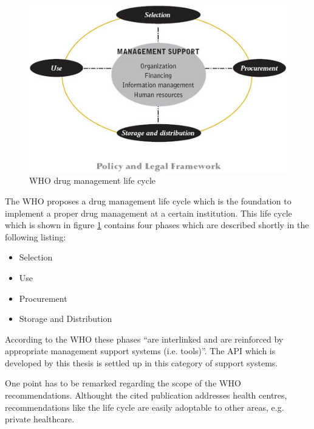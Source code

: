 \begin{figure}
  \centering
  \includegraphics[scale=2]{preliminaries/life_cycle.jpg}
  \caption{WHO drug management life cycle}
  \label{fig:life_cycle}
\end{figure}
The WHO proposes a drug management life cycle which is the foundation to implement a proper drug management at a certain institution.
This life cycle which is shown in figure \ref{fig:life_cycle} contains four phases which are described shortly in the following listing:
\begin{itemize}\todo{}
\item Selection
\item Use
\item Procurement
\item Storage and Distribution
\end{itemize}
According to the WHO these phases ``are interlinked and are reinforced by appropriate management support systems (i.e. tools)''.
The API which is developed by this thesis is settled up in this category of support systems.

One point has to be remarked regarding the scope of the WHO recommendations.
Althought the cited publication addresses health centres, recommendations like the life cycle are easily adoptable to other areas, e.g. private healthcare.

